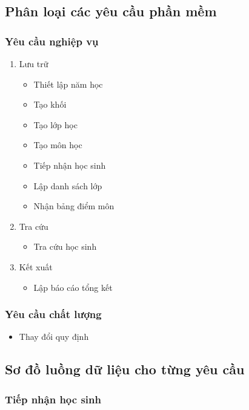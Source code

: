 \documentclass[a4paper]{article}
\begin{document}
	\subsection{Phân loại các yêu cầu phần mềm}
		\subsubsection{Yêu cầu nghiệp vụ}
		\begin{enumerate}[label=\alph*.]
    \item Lưu trữ
    	\begin{itemize}
        \item Thiết lập năm học
        \item Tạo khối
         \item Tạo lớp học
          \item Tạo môn học
          \item Tiếp nhận học sinh
          \item Lập danh sách lớp
          \item Nhận bảng điểm môn
          
    		\end{itemize}
    \item Tra cứu
    		\begin{itemize}
    			\item Tra cứu học sinh
    		\end{itemize}
    \item Kết xuất
			
			\begin{itemize}
			\item Lập báo cáo tổng kết
			\end{itemize}			    		
    		
		\end{enumerate}
		
		\subsubsection{Yêu cầu chất lượng}
		\begin{itemize}
		\item Thay đổi quy định
		\end{itemize}
		
	\subsection{Sơ đồ luồng dữ liệu cho từng yêu cầu}
		\subsubsection{Tiếp nhận học sinh}
		
\end{document}
